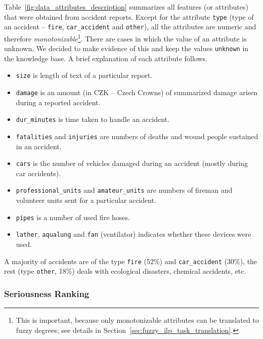 Table~\ref{fig:data_attributes_description} summarizes all features (or attributes) that were obtained from accident reports. Except for the attribute \verb+type+ (type of an accident -- \verb+fire+, \verb+car_accident+ and \verb+other+), all the attributes are numeric and therefore \emph{monotonizable}\footnote{This is important, because only monotonizable attributes can be translated to fuzzy degrees; see details in Section~\ref{sec:fuzzy_ilp_task_translation}.}. There are cases in which the value of an attribute is unknown. We decided to make evidence of this and keep the values \verb+unknown+ in the knowledge base. A brief explanation of each attribute follows.
\begin{itemize}
	\item \verb+size+ is length of text of a particular report.
	\item \verb+damage+ is an amount (in CZK -- Czech Crowns) of summarized damage arisen during a reported accident.
	\item \verb+dur_minutes+ is time taken to handle an accident.
	\item \verb+fatalities+ and \verb+injuries+ are numbers of deaths and wound people sustained in an accident.
	\item \verb+cars+ is the number of vehicles damaged during an accident (mostly during car accidents).
	\item \verb+professional_units+ and \verb+amateur_units+ are numbers of fireman and volunteer units sent for a particular accident.
	\item \verb+pipes+ is a number of used fire hoses.
	\item \verb+lather+, \verb+aqualung+ and \verb+fan+ (ventilator) indicates whether these devices were used.
\end{itemize}

A majority of accidents are of the type \verb+fire+ (52\%)
and \verb+car_accident+ (30\%),
the rest (type \verb+other+, 18\%)
deals with ecological disasters, chemical accidents, etc.

\subsubsection{Seriousness Ranking} \label{sec:data_seriousness}



